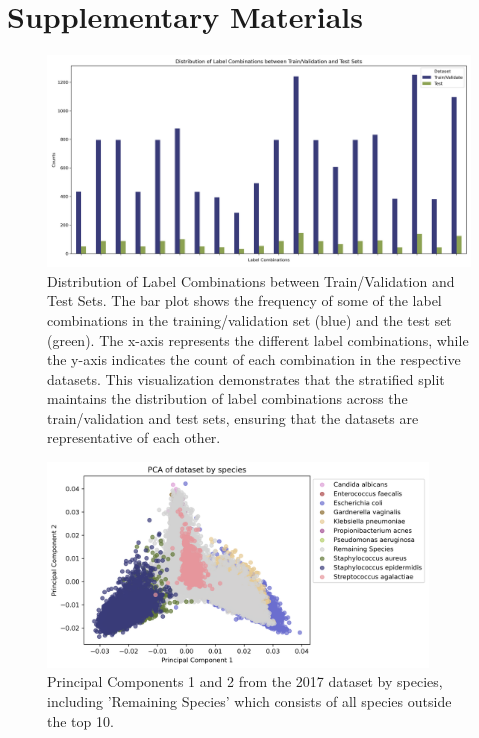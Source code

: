 \documentclass[english,11pt,a4paper,titlepage]{article}
\begin{document}
\newpage
\printbibliography

\clearpage
\renewcommand{\thefigure}{S\arabic{figure}}
\renewcommand{\figurename}{}
\setcounter{figure}{0}

\section*{Supplementary Materials}

\begin{figure}
	\centering
	\begin{minipage}[b!]{0.8\textwidth}
		\includegraphics[width=\textwidth]{img/2018_train_val_test_split.png}
		\captionsetup{font=small}
		\caption{Distribution of Label Combinations between Train/Validation and Test Sets. The bar plot shows the frequency of some of the label combinations in the training/validation set (blue) and the test set (green). The x-axis represents the different label combinations, while the y-axis indicates the count of each combination in the respective datasets. This visualization demonstrates that the stratified split maintains the distribution of label combinations across the train/validation and test sets, ensuring that the datasets are representative of each other.}
		\label{fig:multilabel_split}
	\end{minipage}
\end{figure}
\clearpage

\begin{figure}[h]
	\centering
	\includegraphics[width=0.9\textwidth]{img/PCA_species.png}
	\caption{Principal Components 1 and 2 from the 2017 dataset by species, including 'Remaining Species' which consists of all species outside the top 10.}
	\label{fig:pca_remaining}
\end{figure}
\end{document}
